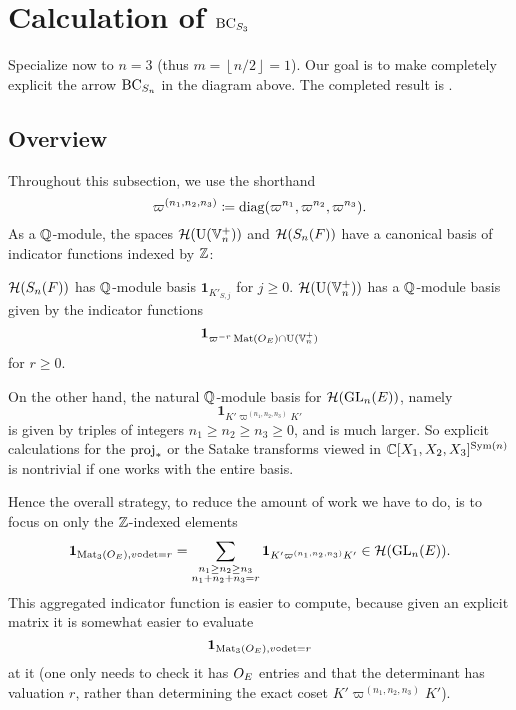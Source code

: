 \section{Calculation of $\operatorname{BC}_{S_3}$}
Specialize now to $n=3$ (thus $m = \left\lfloor n/2 \right\rfloor = 1$).
Our goal is to make completely explicit the arrow $\operatorname{BC}_{S_n}$
in the diagram above.
The completed result is .

\subsection{Overview}
Throughout this subsection, we use the shorthand
\[ \varpi^{(n_1, n_2, n_3)} \coloneqq \operatorname{diag}(\varpi^{n_1}, \varpi^{n_2}, \varpi^{n_3}). \]
As a $\mathbb Q$-module, the spaces $\mathcal H(\operatorname{U}(\mathbb V_n^+))$ and $\mathcal H(S_n(F))$
have a canonical basis of indicator functions indexed by $\mathbb Z$:
\begin{itemize}
  \ii $\mathcal H(S_n(F))$ has $\mathbb Q$-module basis $\mathbf{1}_{K'_{S,j}}$ for $j \ge 0$.
  \ii $\mathcal H(\operatorname{U}(\mathbb V_n^+))$ has a $\mathbb Q$-module basis given by the indicator functions
  \[ \mathbf{1}_{\varpi^{-r} \operatorname{Mat}(O_E) \cap \operatorname{U}(\mathbb V_n^+)} \]
  for $r \ge 0$.
\end{itemize}
On the other hand, the natural $\mathbb Q$-module basis for $\mathcal H(\operatorname{GL}_n(E))$, namely
\[ \mathbf{1}_{K'\varpi^{(n_1, n_2, n_3)}K'} \]
is given by triples of integers $n_1 \ge n_2 \ge n_3 \ge 0$, and is much larger.
So explicit calculations for the $\operatorname{proj}_\ast$ or the Satake transforms viewed in
$\mathbb C[X_1, X_2, X_3]^{\operatorname{Sym}(n)}$ is nontrivial if one works with the entire basis.

Hence the overall strategy, to reduce the amount of work we have to do,
is to focus on only the $\mathbb Z$-indexed elements
\[
  \mathbf{1}_{\operatorname{Mat}_3(O_E), v\circ\det=r}
  = \sum_{\substack{n_1 \ge n_2 \ge n_3 \\ n_1 + n_2 + n_3 = r}}
  \mathbf{1}_{K'\varpi^{(n_1, n_2, n_3)}K'} \in \mathcal H(\operatorname{GL}_n(E)).
\]
This aggregated indicator function is easier to compute,
because given an explicit matrix it is somewhat easier
to evaluate \[ \mathbf{1}_{\operatorname{Mat}_3(O_E), v\circ\det=r} \]
at it (one only needs to check it has $O_E$ entries
and that the determinant has valuation $r$,
rather than determining the exact coset $K'\varpi^{(n_1, n_2, n_3)}K'$).

